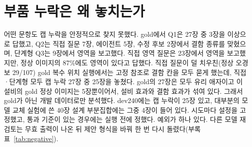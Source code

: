 \documentclass[11pt]{article}
\begin{document}
\section{부품 누락은 왜 놓치는가}\label{sec:missing}
어떤 문항도 캡 누락을 안정적으로 찾지 못했다. gold에서 Q1은 27장 중 3장을 이상으로 답했고, Q2는 직접 질문 7장, 에이전트 5장, 수정 후보 2장에서 결함 종류를 맞혔으며, 단계형 Q3는 9장에서 영역을 보고했다. 직접 영역 질문은 23장에서 영역을 보고했지만, 정상 이미지의 87\%에도 영역이 있다고 답했다. 직접 질문이 덜 치우친(정상 오경보 29/107) gold 복수 위치 실행에서는 고정 참조로 결함 칸을 모두 묻게 했는데, 직접·단계형 모두 캡 누락 27장 중 25장을 놓쳤다. gold의 27장은 모두 유리 애자이고 이 설비의 gold 정상 이미지는 5장뿐이어서, 설비 효과와 결함 효과가 섞여 있다. 그래서 gold가 아닌 개발 데이터로만 분석했다. dev240에는 캡 누락이 25장 있고, 대부분의 모델 교체 실험에 쓴 40장 설계 부분집합에는 그중 4장이 들어 있다. 시도마다 설정을 고정했고, 통과 기준이 있는 경우에는 실행 전에 정했다. 예외가 하나 있다. 다른 모델 재검토는 무효 출력이 나온 뒤 제안 형식을 바꿔 한 번 다시 돌렸다(부록 표~\ref{tab:negative}).
\end{document}
